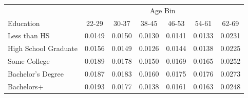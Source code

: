 \begin{tabular}{lcccccc}
\hline\hline
 & \multicolumn{6}{c}{Age Bin} \\
Education & 22-29 & 30-37 & 38-45 & 46-53 & 54-61 & 62-69 \\
\hline
Less than HS&0.0149&0.0150&0.0130&0.0141&0.0133&0.0231\\
High School Graduate&0.0156&0.0149&0.0126&0.0144&0.0138&0.0225\\
Some College&0.0189&0.0178&0.0150&0.0169&0.0165&0.0252\\
Bachelor's Degree&0.0187&0.0183&0.0160&0.0175&0.0176&0.0273\\
Bachelors+&0.0193&0.0177&0.0138&0.0161&0.0163&0.0248\\
\hline\hline
\end{tabular}
